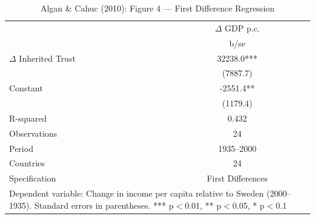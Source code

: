 \begin{table}[htbp]\centering
\def\sym#1{\ifmmode^{#1}\else\(^{#1}\)\fi}
\caption{Algan \& Cahuc (2010): Figure 4 --- First Difference Regression}
\begin{tabular}{l*{1}{c}}
\toprule
            &\multicolumn{1}{c}{$\Delta$ GDP p.c.}\\
            &        b/se   \\
\midrule
$\Delta$ Inherited Trust&     32238.0***\\
            &    (7887.7)   \\
Constant    &     -2551.4** \\
            &    (1179.4)   \\
\midrule
R-squared   &       0.432   \\
Observations&          24   \\
Period      &  1935--2000   \\
Countries   &          24   \\
Specification&First Differences   \\
\bottomrule
\multicolumn{2}{l}{\footnotesize Dependent variable: Change in income per capita relative to Sweden (2000--1935).  Standard errors in parentheses.  *** p$<$0.01, ** p$<$0.05, * p$<$0.1}\\
\end{tabular}
\end{table}

